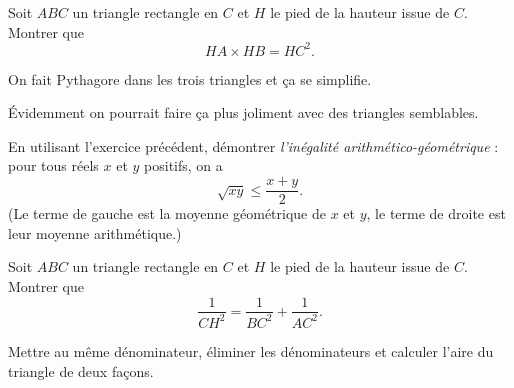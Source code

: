 \begin{exo}
Soit $ABC$ un triangle rectangle en $C$ et $H$ le pied de la hauteur issue de $C$.
Montrer que 
\[ HA\times HB = HC^2.\]
\begin{center}
\end{center}
\begin{sol}
On fait Pythagore dans les trois triangles et ça se simplifie.

Évidemment on pourrait faire ça plus joliment avec des triangles semblables.
\end{sol}
\end{exo}





\begin{exo}
En utilisant l'exercice précédent, démontrer \emph{l'inégalité arithmético-géométrique}  : pour tous réels $x$ et $y$ positifs, on a 
\[ \sqrt{xy} \leq \frac{x+y}{2}.\]
(Le terme de gauche est la moyenne géométrique de $x$ et $y$, le terme de droite est leur moyenne arithmétique.) 
\end{exo}




\begin{exo}
Soit $ABC$ un triangle rectangle en $C$ et $H$ le pied de la hauteur issue de $C$.
Montrer que 
\[ \frac{1}{CH^2} = \frac{1}{BC^2}+\frac{1}{AC^2}.\]
\begin{center}
\end{center}
\begin{hint}
Mettre au même dénominateur, éliminer les dénominateurs et calculer l'aire du triangle de deux façons.
\end{hint}
\end{exo}



